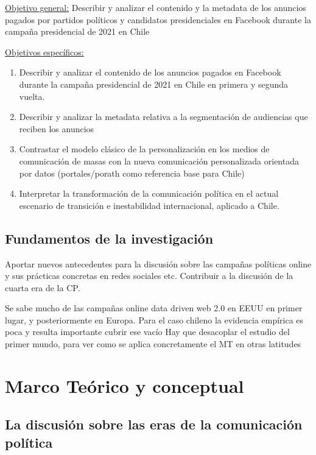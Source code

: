 \documentclass[
  10pt,
  letterpaper,
]{report}
\begin{document}
\underline{Objetivo general:} Describir y analizar el contenido y la
metadata de los anuncios pagados por partidos políticos y candidatos
presidenciales en Facebook durante la campaña presidencial de 2021 en
Chile

\underline{Objetivos específicos:}

\begin{enumerate}
\def\labelenumi{\arabic{enumi}.}
\item
  Describir y analizar el contenido de los anuncios pagados en Facebook
  durante la campaña presidencial de 2021 en Chile en primera y segunda
  vuelta.
\item
  Describir y analizar la metadata relativa a la segmentación de
  audiencias que reciben los anuncios
\item
  Contrastar el modelo clásico de la personalización en los medios de
  comunicación de masas con la nueva comunicación personalizada
  orientada por datos (portales/porath como referencia base para Chile)
\item
  Interpretar la transformación de la comunicación política en el actual
  escenario de transición e inestabilidad internacional, aplicado a
  Chile.
\end{enumerate}

\hypertarget{fundamentos-de-la-investigaciuxf3n}{%
\section{Fundamentos de la
investigación}\label{fundamentos-de-la-investigaciuxf3n}}

Aportar nuevos antecedentes para la discusión sobre las campañas
políticas online y sus prácticas concretas en redes sociales etc.
Contribuir a la discusión de la cuarta era de la CP.

Se sabe mucho de las campañas online data driven web 2.0 en EEUU en
primer lugar, y posteriormente en Europa. Para el caso chileno la
evidencia empírica es poca y resulta importante cubrir ese vacío Hay que
desacoplar el estudio del primer mundo, para ver como se aplica
concretamente el MT en otras latitudes

\hypertarget{marco-teuxf3rico-y-conceptual}{%
\chapter{Marco Teórico y
conceptual}\label{marco-teuxf3rico-y-conceptual}}

\hypertarget{la-discusiuxf3n-sobre-las-eras-de-la-comunicaciuxf3n-poluxedtica}{%
\section{La discusión sobre las eras de la comunicación
política}\label{la-discusiuxf3n-sobre-las-eras-de-la-comunicaciuxf3n-poluxedtica}}
\end{document}
